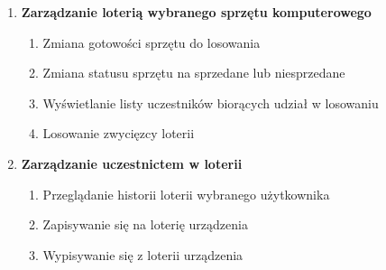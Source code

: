 \begin{enumerate}[label={\textbf{FR}-\bfseries\arabic*}]
		
		\item \textbf{Zarządzanie loterią wybranego sprzętu komputerowego}
		\begin{enumerate}[label={FR-\arabic{enumi}.\arabic*},noparskip]
        \item Zmiana gotowości sprzętu do losowania
        \item Zmiana statusu sprzętu na sprzedane lub niesprzedane
				\item Wyświetlanie listy uczestników biorących udział w losowaniu
        \item Losowanie zwycięzcy loterii
    \end{enumerate}
		
		\item \textbf{Zarządzanie uczestnictem w loterii}
			\begin{enumerate}[label={FR-\arabic{enumi}.\arabic*},noparskip]
        \item Przeglądanie historii loterii wybranego użytkownika
        \item Zapisywanie się na loterię urządzenia
				\item Wypisywanie się z loterii urządzenia
    \end{enumerate}
		
		
		
\end{enumerate}





\newcommand\addrow[2]{#1 & #2\\ \hline}

\newcommand\additemizedrow[2]{#1 &
        \begin{tabenum}
            #2
        \end{tabenum}
        \\ \hline}

\newcommand\name[1]{\addrow{Nazwa}{#1}}
\newcommand\actor[1]{\addrow{Aktor}{#1}}
\newcommand\udescription[1]{\addrow{Opis}{#1}}
\newcommand\precondition[1]{\addrow{Warunki wstępne}{#1}}
\newcommand\scenario[1]{\additemizedrow{Scenariusz}{#1}}
\newcommand\alternateScenario[1]{\additemizedrow{Alternatywny}{#1}}
\newcommand\extend[1]{\additemizedrow{Extend}{#1}}
\newcommand\includee[1]{\additemizedrow{Include}{#1}}

\newenvironment{usecase}{\tabularx{\textwidth}{|0{wl{3cm}}|0{X}|}\hline}{\endtabularx}
\setlength{\parindent}{0em}
\setlength{\parskip}{1em}

